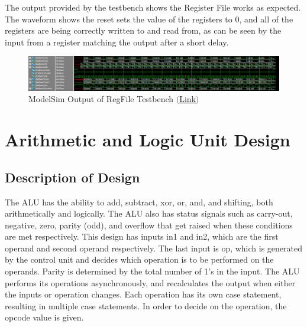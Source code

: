 \documentclass[10pt,letterpaper]{article}
\begin{document}
The output provided by the testbench shows the Register File works as expected. The waveform shows the reset sets the value of the registers to 0, and all of the registers are being correctly written to and read from, as can be seen by the input from a register matching the output after a short delay.
\begin{figure}[H]
	\centering
	\includegraphics[width=\linewidth]{Figures/RegFileTB}
	\caption{ModelSim Output of RegFile Testbench \href{https://drive.google.com/file/d/16UZ02iNjlCKq06zk10P5jfhbaC_pfCuJ/view?usp=sharing}{$($Link$)$}}
	\label{fig:regfiletb}
\end{figure}
\newpage
\section{Arithmetic and Logic Unit Design}
\subsection{Description of Design}
The ALU has the ability to add, subtract, xor, or, and, and shifting, both arithmetically and logically. The ALU also has status signals such as carry-out, negative, zero, parity (odd), and overflow that get raised when these conditions are met respectively. This design has inputs in1 and in2, which are the first operand and second operand respectively. The last input is op, which is generated by the control unit and decides which operation is to be performed on the operands. Parity is determined by the total number of 1’s in the input. The ALU performs its operations asynchronously, and recalculates the output when either the inputs or operation changes. Each operation has its own case statement, resulting in multiple case statements. In order to decide on the operation, the opcode value is given. 
\end{document}
